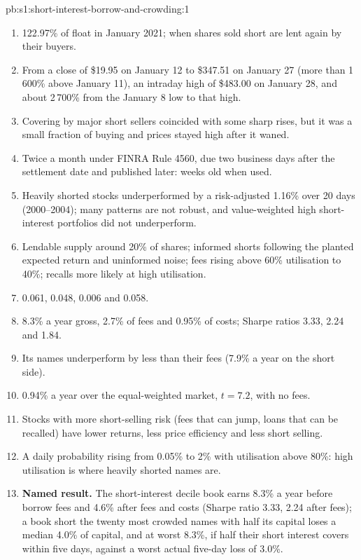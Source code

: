 \begin{solution}{pb:s1:short-interest-borrow-and-crowding:1}
\begin{enumerate}
\item 122.97\% of float in January 2021; when shares sold short are lent again by their buyers.
\item From a close of \$19.95 on January 12 to \$347.51 on January 27 (more than 1\,600\% above January 11), an intraday high of \$483.00 on January 28, and
about 2\,700\% from the January 8 low to that high.
\item Covering by major short sellers coincided with some sharp rises, but it was a small fraction of buying and prices stayed high after it waned.
\item Twice a month under FINRA Rule 4560, due two business days after the settlement date and published later: weeks old when used.
\item Heavily shorted stocks underperformed by a risk-adjusted 1.16\% over 20 days (2000--2004); many patterns are not robust, and value-weighted high
short-interest portfolios did not underperform.
\item Lendable supply around 20\% of shares; informed shorts following the planted expected return and uninformed noise; fees rising above 60\%
utilisation to 40\%; recalls more likely at high utilisation.
\item 0.061, 0.048, 0.006 and 0.058.
\item 8.3\% a year gross, 2.7\% of fees and 0.95\% of costs; Sharpe ratios 3.33, 2.24 and 1.84.
\item Its names underperform by less than their fees (7.9\% a year on the short side).
\item 0.94\% a year over the equal-weighted market, $t = 7.2$, with no fees.
\item Stocks with more short-selling risk (fees that can jump, loans that can be recalled) have lower returns, less price efficiency and less short
selling.
\item A daily probability rising from 0.05\% to 2\% with utilisation above 80\%: high utilisation is where heavily shorted names are.
\item \textbf{Named result.} The short-interest decile book earns 8.3\% a year before borrow fees and 4.6\% after fees and costs (Sharpe ratio 3.33, 2.24
after fees); a book short the twenty most crowded names with half its capital loses a median 4.0\% of capital, and at worst 8.3\%, if half their short
interest covers within five days, against a worst actual five-day loss of 3.0\%.

\end{enumerate}
\end{solution}
